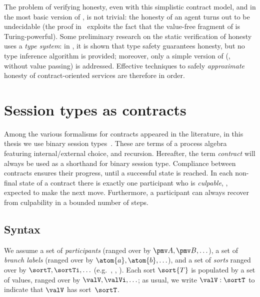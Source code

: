The problem of verifying honesty, even with this simplistic contract model, and in the most basic version of \coco, is not trivial: the honesty of an agent turns out to be undecidable (the proof in~\cite{BTZ12coordination} exploits the fact that the value-free fragment of \coco is Turing-powerful).
%
Some preliminary research on the static verification of honesty uses a \emph{type system}: in \cite{BSTZ13forte}, it is shown that type safety guarantees honesty, but no type inference algorithm is provided; moreover, %
only a simple version of \coco (\eg, without value passing) is addressed. Effective techniques to safely \emph{approximate} honesty of contract-oriented services are therefore in order.

\section{Session types as contracts} \label{sec:contract-session-types}

Among the various formalisms for contracts appeared in the literature, in this thesis we use binary session types~\cite{Honda98esop}.
These are terms of a process algebra featuring internal/external choice, and recursion. Hereafter, the term \emph{contract} will always be used 
as a shorthand for binary session type.
Compliance between contracts ensures their progress, until a successful state is reached.
In each non-final state of a contract there is exactly one participant who is \emph{culpable}, \ie, expected to make the next move. Furthermore, a participant can always recover from culpability in a bounded number of steps.

\subsection{Syntax}

We assume a set of \emph{participants} (ranged over by ${\pmv A}, {\pmv B}, \ldots$), a set of \emph{branch labels} (ranged over by $\atom{a}, \atom{b}, \ldots$), and a set of \emph{sorts} ranged over by $\sortT, \sortTi, \ldots$ (e.g.\ , , ).
Each sort $\sort{T}$ is populated by a set of values, ranged over by $\valV, \valVi, \ldots$; as usual, we write $\valV: \sortT$ to indicate that $\valV$ has sort~$\sortT$.

